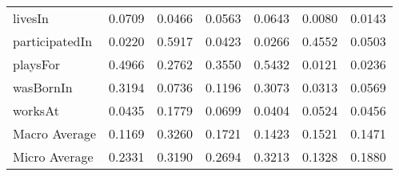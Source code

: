 \begin{table}[htbp]
\begin{center}
\begin{tabular}{|l||c|c|c||c|c|c|}
    livesIn & 0.0709 & 0.0466 & 0.0563 & 0.0643 & 0.0080 & 0.0143 \\
    participatedIn & 0.0220 & 0.5917 & 0.0423 & 0.0266 & 0.4552 & 0.0503 \\
    playsFor & 0.4966 & 0.2762 & 0.3550 & 0.5432 & 0.0121 & 0.0236 \\
    wasBornIn & 0.3194 & 0.0736 & 0.1196 & 0.3073 & 0.0313 & 0.0569 \\
    worksAt & 0.0435 & 0.1779 & 0.0699 & 0.0404 & 0.0524 & 0.0456 \\
    \hline
    Macro Average & 0.1169 & 0.3260 & 0.1721 & 0.1423 & 0.1521 & 0.1471 \\
    Micro Average & 0.2331 & 0.3190 & 0.2694 & 0.3213 & 0.1328 & 0.1880 \\
    \hline
\end{tabular}
\end{center}
\end{table}


